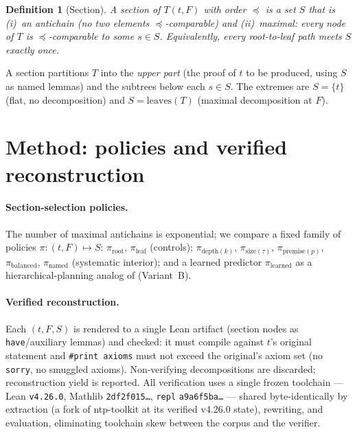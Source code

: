 \documentclass[11pt]{article}
\newtheorem{definition}{Definition}
\begin{document}
\begin{definition}[Section]
\label{def:section}
A \emph{section} of $T(t,F)$ with order $\preceq$ is a set $S$ that is
(i)~an antichain (no two elements $\preceq$-comparable) and (ii)~maximal:
every node of $T$ is $\preceq$-comparable to some $s\in S$. Equivalently,
every root-to-leaf path meets $S$ exactly once.
\end{definition}

A section partitions $T$ into the \emph{upper part} (the proof of $t$ to be
produced, using $S$ as named lemmas) and the subtrees below each $s\in S$.
The extremes are $S=\{t\}$ (flat, no decomposition) and $S=\mathrm{leaves}(T)$
(maximal decomposition at $F$).

\section{Method: policies and verified reconstruction}
\label{sec:method}

\paragraph{Section-selection policies.} The number of maximal antichains is
exponential; we compare a fixed family of policies $\pi:(t,F)\mapsto S$:
$\pi_{\mathrm{root}}$, $\pi_{\mathrm{leaf}}$ (controls);
$\pi_{\mathrm{depth}(k)}$, $\pi_{\mathrm{size}(\tau)}$,
$\pi_{\mathrm{premise}(p)}$, $\pi_{\mathrm{balanced}}$, $\pi_{\mathrm{named}}$
(systematic interior); and a learned predictor $\pi_{\mathrm{learned}}$ as a
hierarchical-planning analog of \citet{zhang2026hierarchical} (Variant~B).

\paragraph{Verified reconstruction.} Each $(t,F,S)$ is rendered to a single
Lean artifact (section nodes as \texttt{have}/auxiliary lemmas) and checked:
it must compile against $t$'s original statement and \texttt{\#print axioms}
must not exceed the original's axiom set (no \texttt{sorry}, no smuggled
axioms). Non-verifying decompositions are discarded; reconstruction yield is
reported. All verification uses a single frozen toolchain --- Lean
\texttt{v4.26.0}, Mathlib \texttt{2df2f015\ldots}, \texttt{repl}
\texttt{a9a6f5ba\ldots} --- shared byte-identically by extraction (a fork of
ntp-toolkit \citep{hu2024minictx} at its verified v4.26.0 state), rewriting,
and evaluation, eliminating toolchain skew between the corpus and the
verifier.
\end{document}
